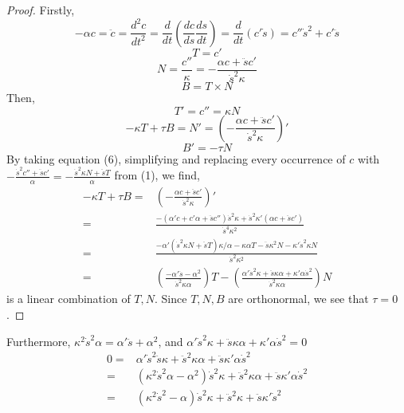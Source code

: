 \documentclass[12pt]{amsart}
\begin{document}
\begin{proof}
Firstly,
\begin{equation}
	-\alpha c=\ddot c=\frac{d^2c}{dt^2}=\frac{d}{dt}\left(\frac{dc}{ds}\frac{ds}{dt}\right)=\frac{d}{dt}\left(c'\dot s\right)=c''\dot s^2+c'\ddot s%
\end{equation}
\begin{equation}
	T=c'
\end{equation}
\begin{equation}
	N=\frac{c''}{\kappa}=-\frac{\alpha c+\ddot sc'}{\dot s^2\kappa}
\end{equation}
\begin{equation}
	B=T\times N
\end{equation}
Then,
\begin{equation}
	T'=c''=\kappa N
\end{equation}
\begin{equation}
	-\kappa T+\tau B=N'=\left(-\frac{\alpha c+\ddot sc'}{\dot s^2\kappa}\right)'
\end{equation}
\begin{equation}
	B'=-\tau N
\end{equation}
By taking equation (6), simplifying and replacing every occurrence of $c$ with $-\frac{\dot s^2c''+\ddot sc'}{\alpha}=-\frac{\dot s^2\kappa N+\ddot sT}{\alpha}$ from (1), we find, 
\begin{align*}
	-\kappa T+\tau B=&\left(-\frac{\alpha c+\ddot sc'}{\dot s^2\kappa}\right)'
	\\=&\frac{-(\alpha'c+c'\alpha+\ddot sc'')\dot s^2\kappa+\dot s^2\kappa'(\alpha c+\ddot sc')}{\dot s^4\kappa^2}
	\\=&\frac{-\alpha'(\dot s^2\kappa N+\ddot sT)\kappa/\alpha-\kappa\alpha T-\ddot s\kappa^2N-\kappa'\dot s^2\kappa N}{\dot s^2\kappa^2}
	\\=&\left(\frac{-\alpha'\ddot s-\alpha^2}{\dot s^2\kappa\alpha}\right)T-\left(\frac{\alpha'\dot s^2\kappa+\ddot s\kappa\alpha+\kappa'\alpha\dot s^2}{\dot s^2\kappa\alpha}\right)N
\end{align*}
is a linear combination of $T, N$. Since $T,N,B$ are orthonormal, we see that $\tau=0$.
\end{proof}
Furthermore, $\kappa^2\dot s^2\alpha=\alpha'\ddot s+\alpha^2$, and $\alpha'\dot s^2\kappa+\ddot s\kappa\alpha+\kappa'\alpha\dot s^2=0$
\begin{align*}
	0=&\alpha'\dot s^2\ddot s\kappa+\ddot s^2\kappa\alpha+\ddot s\kappa'\alpha\dot s^2
	\\=&(\kappa^2\dot s^2\alpha-\alpha^2)\dot s^2\kappa+\ddot s^2\kappa\alpha+\ddot s\kappa'\alpha\dot s^2
	\\=&(\kappa^2\dot s^2-\alpha)\dot s^2\kappa+\ddot s^2\kappa+\ddot s\kappa'\dot s^2
\end{align*}
\end{document}
